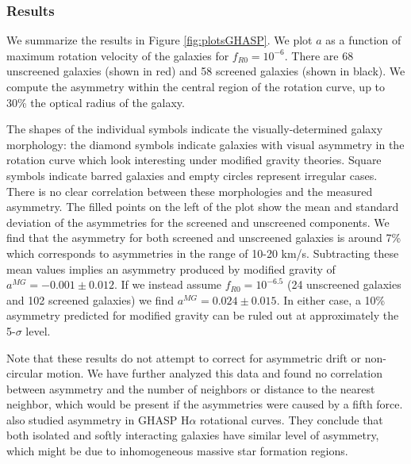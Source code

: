 \documentclass[twocolappendix, numberedappendix]{emulateapj}
\newcommand{\ha}{H$\alpha$}
\begin{document}
% 


\subsubsection{Results}
We summarize the results in Figure \ref{fig:plotsGHASP}.  We plot  $a$
as a function of maximum rotation velocity of the galaxies for
$f_{R0}=10^{-6}$. There are 68 unscreened galaxies
(shown in red) and 58 screened galaxies (shown in black).
We compute the asymmetry within the central region of the rotation curve,
up to 30\% the optical radius of the galaxy.

The shapes of the individual symbols indicate the visually-determined galaxy
morphology: the diamond symbols indicate
galaxies with visual asymmetry in the rotation curve which look interesting
under modified gravity theories. Square symbols indicate barred
galaxies and empty circles represent irregular cases.
There is no clear correlation between these morphologies and the
measured asymmetry.   The filled points on the left of the plot show the
mean and standard deviation of the asymmetries for the screened and unscreened
components. We find that the asymmetry for both
screened and unscreened galaxies is around 7\% which corresponds to
asymmetries in the range of 10-20 km/s.
Subtracting these mean values implies an asymmetry produced by modified
gravity of $a^{MG}=-0.001\pm 0.012$.
If we instead assume $f_{R0}=10^{-6.5}$ (24 unscreened galaxies and 102
screened galaxies) we find $a^{MG}=0.024\pm 0.015$.
In either case, a 10\% asymmetry predicted for modified gravity can be
ruled out at approximately the 5-$\sigma$ level.

Note that
these results do not attempt to correct for asymmetric drift or non-circular
motion.  We have further analyzed this data and found no correlation between
asymmetry and the number of neighbors or distance to the nearest neighbor,
which would be present if the asymmetries were caused by a fifth force.
\citet{garrido05} also studied asymmetry in
GHASP \ha{} rotational curves. They conclude that both isolated and softly
interacting galaxies have similar level of asymmetry, which might be due to
inhomogeneous massive star formation regions.
\end{document}
